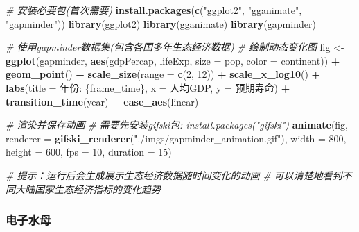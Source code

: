 \documentclass[
]{book}
\newenvironment{Shaded}{\begin{snugshade}}{\end{snugshade}}
\newcommand{\AttributeTok}[1]{\textcolor[rgb]{0.13,0.29,0.53}{#1}}
\newcommand{\CommentTok}[1]{\textcolor[rgb]{0.56,0.35,0.01}{\textit{#1}}}
\newcommand{\DecValTok}[1]{\textcolor[rgb]{0.00,0.00,0.81}{#1}}
\newcommand{\FunctionTok}[1]{\textcolor[rgb]{0.13,0.29,0.53}{\textbf{#1}}}
\newcommand{\NormalTok}[1]{#1}
\newcommand{\OtherTok}[1]{\textcolor[rgb]{0.56,0.35,0.01}{#1}}
\newcommand{\SpecialCharTok}[1]{\textcolor[rgb]{0.81,0.36,0.00}{\textbf{#1}}}
\newcommand{\StringTok}[1]{\textcolor[rgb]{0.31,0.60,0.02}{#1}}
\begin{document}
\begin{Shaded}
\begin{Highlighting}[]
\CommentTok{\# 安装必要包(首次需要)}
\FunctionTok{install.packages}\NormalTok{(}\FunctionTok{c}\NormalTok{(}\StringTok{"ggplot2"}\NormalTok{, }\StringTok{"gganimate"}\NormalTok{, }\StringTok{"gapminder"}\NormalTok{))}
\FunctionTok{library}\NormalTok{(ggplot2)}
\FunctionTok{library}\NormalTok{(gganimate)}
\FunctionTok{library}\NormalTok{(gapminder)}

\CommentTok{\# 使用gapminder数据集(包含各国多年生态经济数据)}
\CommentTok{\# 绘制动态变化图}
\NormalTok{fig }\OtherTok{\textless{}{-}} \FunctionTok{ggplot}\NormalTok{(gapminder, }\FunctionTok{aes}\NormalTok{(gdpPercap, lifeExp, }\AttributeTok{size =}\NormalTok{ pop, }\AttributeTok{color =}\NormalTok{ continent)) }\SpecialCharTok{+}
  \FunctionTok{geom\_point}\NormalTok{() }\SpecialCharTok{+}
  \FunctionTok{scale\_size}\NormalTok{(}\AttributeTok{range =} \FunctionTok{c}\NormalTok{(}\DecValTok{2}\NormalTok{, }\DecValTok{12}\NormalTok{)) }\SpecialCharTok{+}
  \FunctionTok{scale\_x\_log10}\NormalTok{() }\SpecialCharTok{+}
  \FunctionTok{labs}\NormalTok{(}\AttributeTok{title =} \StringTok{\textquotesingle{}年份: \{frame\_time\}\textquotesingle{}}\NormalTok{, }\AttributeTok{x =} \StringTok{\textquotesingle{}人均GDP\textquotesingle{}}\NormalTok{, }\AttributeTok{y =} \StringTok{\textquotesingle{}预期寿命\textquotesingle{}}\NormalTok{) }\SpecialCharTok{+}
  \FunctionTok{transition\_time}\NormalTok{(year) }\SpecialCharTok{+}
  \FunctionTok{ease\_aes}\NormalTok{(}\StringTok{\textquotesingle{}linear\textquotesingle{}}\NormalTok{)}

\CommentTok{\# 渲染并保存动画}
\CommentTok{\# 需要先安装gifski包: install.packages("gifski")}
\FunctionTok{animate}\NormalTok{(fig, }\AttributeTok{renderer =} \FunctionTok{gifski\_renderer}\NormalTok{(}\StringTok{"./imgs/gapminder\_animation.gif"}\NormalTok{), }
        \AttributeTok{width =} \DecValTok{800}\NormalTok{, }\AttributeTok{height =} \DecValTok{600}\NormalTok{, }\AttributeTok{fps =} \DecValTok{10}\NormalTok{, }\AttributeTok{duration =} \DecValTok{15}\NormalTok{)}

\CommentTok{\# 提示：运行后会生成展示生态经济数据随时间变化的动画}
\CommentTok{\# 可以清楚地看到不同大陆国家生态经济指标的变化趋势}
\end{Highlighting}
\end{Shaded}

\hypertarget{ux7535ux5b50ux6c34ux6bcd}{%
\subsubsection{电子水母}\label{ux7535ux5b50ux6c34ux6bcd}}
\end{document}
